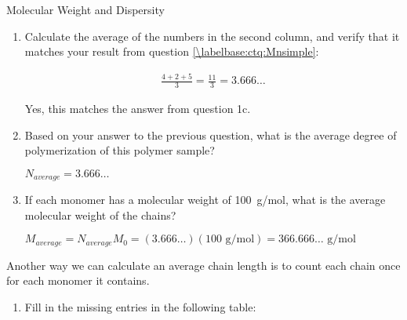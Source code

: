 \begin{activity}{Molecular Weight and Dispersity}
\begin{ctqs}
\begin{enumerate}
			\item Calculate the average of the numbers in the second column, and verify that it matches your result from question \ref{\labelbase:ctq:Mnsimple}:
			
				\begin{solution}[1in]{}
					\begin{align*}
						\frac{4+2+5}{3} = \frac{11}{3} = 3.666\dots
					\end{align*}
					
					Yes, this matches the answer from question 1c.%
					
				\end{solution}
			
			\item Based on your answer to the previous question, what is the average degree of polymerization of this polymer sample?
			
				\begin{solution}[0.75in]{}
				
					$N_{average} = 3.666\dots$
					
				\end{solution}
				
			\item If each monomer has a molecular weight of 100~g/mol, what is the average molecular weight of the chains?
			
				\begin{solution}[1in]{}
				
					$M_{average} = N_{average}M_0 = (3.666\dots)(100\text{ g/mol}) = 366.666\dots\text{ g/mol}$
				
				\end{solution}
				
		\end{enumerate}
	
	\clearpage
	\question Another way we can calculate an average chain length is to count each chain once for each monomer it contains.
				\label{\labelbase:ctq:Mwcalc}
	
		\begin{enumerate}
			\item Fill in the missing entries in the following table:
			

\end{enumerate}
\end{ctqs}
\end{activity}

